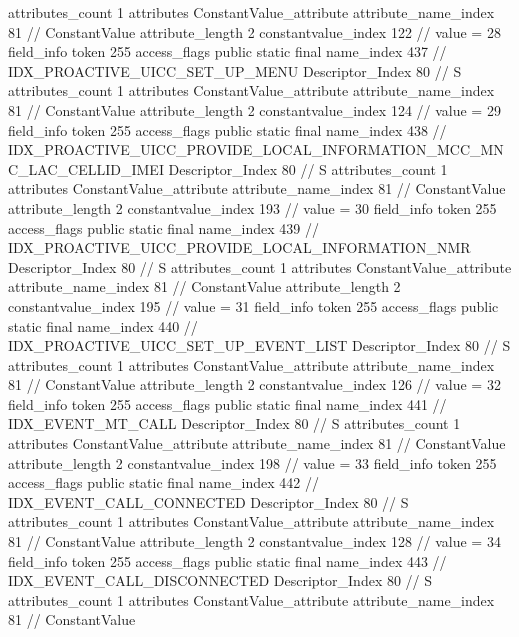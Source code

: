 {{{{{				attributes_count	1
				attributes {
				ConstantValue_attribute {
					attribute_name_index	81		// ConstantValue
					attribute_length	2
					constantvalue_index	122		// value = 28
				}
				}
			}
			field_info {
				token	255
				access_flags	public static final
				name_index	437		// IDX_PROACTIVE_UICC_SET_UP_MENU
				Descriptor_Index	80		// S
				attributes_count	1
				attributes {
				ConstantValue_attribute {
					attribute_name_index	81		// ConstantValue
					attribute_length	2
					constantvalue_index	124		// value = 29
				}
				}
			}
			field_info {
				token	255
				access_flags	public static final
				name_index	438		// IDX_PROACTIVE_UICC_PROVIDE_LOCAL_INFORMATION_MCC_MNC_LAC_CELLID_IMEI
				Descriptor_Index	80		// S
				attributes_count	1
				attributes {
				ConstantValue_attribute {
					attribute_name_index	81		// ConstantValue
					attribute_length	2
					constantvalue_index	193		// value = 30
				}
				}
			}
			field_info {
				token	255
				access_flags	public static final
				name_index	439		// IDX_PROACTIVE_UICC_PROVIDE_LOCAL_INFORMATION_NMR
				Descriptor_Index	80		// S
				attributes_count	1
				attributes {
				ConstantValue_attribute {
					attribute_name_index	81		// ConstantValue
					attribute_length	2
					constantvalue_index	195		// value = 31
				}
				}
			}
			field_info {
				token	255
				access_flags	public static final
				name_index	440		// IDX_PROACTIVE_UICC_SET_UP_EVENT_LIST
				Descriptor_Index	80		// S
				attributes_count	1
				attributes {
				ConstantValue_attribute {
					attribute_name_index	81		// ConstantValue
					attribute_length	2
					constantvalue_index	126		// value = 32
				}
				}
			}
			field_info {
				token	255
				access_flags	public static final
				name_index	441		// IDX_EVENT_MT_CALL
				Descriptor_Index	80		// S
				attributes_count	1
				attributes {
				ConstantValue_attribute {
					attribute_name_index	81		// ConstantValue
					attribute_length	2
					constantvalue_index	198		// value = 33
				}
				}
			}
			field_info {
				token	255
				access_flags	public static final
				name_index	442		// IDX_EVENT_CALL_CONNECTED
				Descriptor_Index	80		// S
				attributes_count	1
				attributes {
				ConstantValue_attribute {
					attribute_name_index	81		// ConstantValue
					attribute_length	2
					constantvalue_index	128		// value = 34
				}
				}
			}
			field_info {
				token	255
				access_flags	public static final
				name_index	443		// IDX_EVENT_CALL_DISCONNECTED
				Descriptor_Index	80		// S
				attributes_count	1
				attributes {
				ConstantValue_attribute {
					attribute_name_index	81		// ConstantValue
}}}}}}}
